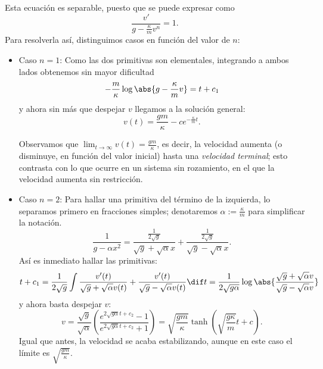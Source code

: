 \documentclass[../main.tex]{subfiles}
\begin{document}
\begin{solution}
	Esta ecuación es separable, puesto que se puede expresar como
	\[\frac{v'}{g - \frac{\kappa}{m} v^n} = 1.\]
	Para resolverla así, distinguimos casos en función del valor de \(n\):
	\begin{itemize}
	  \item Caso \(n = 1\):
		Como las dos primitivas son elementales, integrando a ambos lados
		obtenemos sin mayor dificultad
		\[-\frac{m}{\kappa} \log \abs{g - \frac{\kappa}{m} v} = t + c_1\]
		y ahora sin más que despejar \(v\) llegamos a la solución general:
		\[v(t) = \frac{gm}{\kappa} - ce^{-\frac{\kappa}{m}t}.\]

		Observamos que \(\lim_{t \to \infty} v(t) = \frac{gm}{\kappa}\), es
		decir, la velocidad aumenta (o disminuye, en función del valor inicial)
		hasta una \emph{velocidad terminal}; esto contrasta con lo que ocurre en
		un sistema sin rozamiento, en el que la velocidad aumenta sin
		restricción.
	  \item Caso \(n = 2\): Para hallar una primitiva del término de la
		izquierda, lo separamos primero en fracciones simples; denotaremos
		\(\alpha := \frac{\kappa}{m}\) para simplificar la notación.
		\[\frac{1}{g - \alpha x^2} = \frac{\frac{1}{2\sqrt{g}}}{\sqrt{g} +
				\sqrt{\alpha}x} + \frac{\frac{1}{2\sqrt{g}}}{\sqrt{g} -
				\sqrt{\alpha}x}.\]
		  Así es inmediato hallar las primitivas:
		  \[t + c_1 = \frac{1}{2\sqrt{g}} \int \frac{v'(t)}{\sqrt{g} +
				\sqrt{\alpha}v(t)} + \frac{v'(t)}{\sqrt{g} - \sqrt{\alpha}v(t)}
			  \dif t = \frac{1}{2\sqrt{g\alpha}} \log \abs{\frac{\sqrt{g} +
				  \sqrt{\alpha}v}{\sqrt{g} - \sqrt{\alpha}v}}\]
		  y ahora basta despejar \(v\):
		  \[v =
			  \frac{\sqrt{g}}{\sqrt{\alpha}}\left(\frac{e^{2\sqrt{g\alpha}t+c_2}-1}{e^{2\sqrt{g\alpha}t+c_2}+1}\right)
			  =
			  \sqrt{\frac{gm}{\kappa}}\tanh\left(\sqrt{\frac{g\kappa}{m}}t+c\right).\]
		  Igual que antes, la velocidad se acaba estabilizando, aunque en este
		  caso el límite es \(\sqrt{\frac{gm}{\kappa}}\).
	\end{itemize}
\end{solution}
\end{document}
